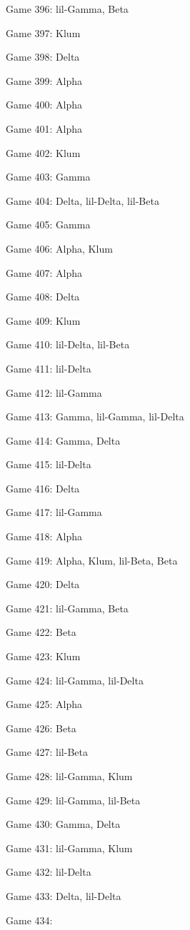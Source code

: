 \documentclass{article}
\begin{document}
\begin{multicols}{3}
\begin{compactitem}
\item Game 396:
lil-Gamma, Beta
\item Game 397:
Klum
\item Game 398:
Delta
\item Game 399:
Alpha
\item Game 400:
Alpha
\item Game 401:
Alpha
\item Game 402:
Klum
\item Game 403:
Gamma
\item Game 404:
Delta, lil-Delta, lil-Beta
\item Game 405:
Gamma
\item Game 406:
Alpha, Klum
\item Game 407:
Alpha
\item Game 408:
Delta
\item Game 409:
Klum
\item Game 410:
lil-Delta, lil-Beta
\item Game 411:
lil-Delta
\item Game 412:
lil-Gamma
\item Game 413:
Gamma, lil-Gamma, lil-Delta
\item Game 414:
Gamma, Delta
\item Game 415:
lil-Delta
\item Game 416:
Delta
\item Game 417:
lil-Gamma
\item Game 418:
Alpha
\item Game 419:
Alpha, Klum, lil-Beta, Beta
\item Game 420:
Delta
\item Game 421:
lil-Gamma, Beta
\item Game 422:
Beta
\item Game 423:
Klum
\item Game 424:
lil-Gamma, lil-Delta
\item Game 425:
Alpha
\item Game 426:
Beta
\item Game 427:
lil-Beta
\item Game 428:
lil-Gamma, Klum
\item Game 429:
lil-Gamma, lil-Beta
\item Game 430:
Gamma, Delta
\item Game 431:
lil-Gamma, Klum
\item Game 432:
lil-Delta
\item Game 433:
Delta, lil-Delta
\item Game 434:

\end{compactitem}
\end{multicols}
\end{document}
